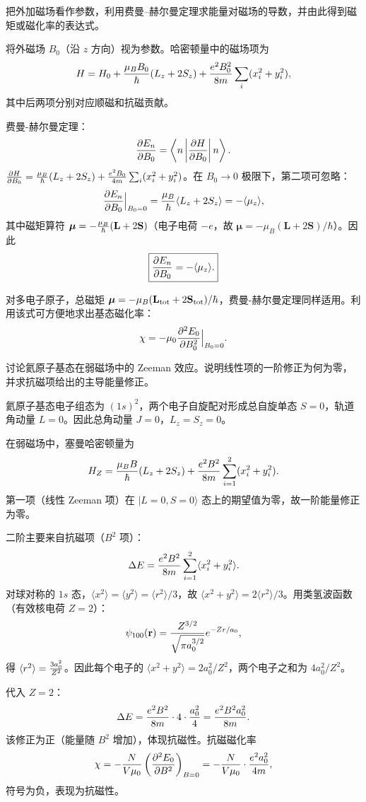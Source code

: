 \begin{question}
把外加磁场看作参数，利用费曼--赫尔曼定理求能量对磁场的导数，并由此得到磁矩或磁化率的表达式。
\end{question}
\begin{solution}
将外磁场 $B_0$（沿 $z$ 方向）视为参数。哈密顿量中的磁场项为
\[
H = H_0 + {\mu_B B_0\over\hbar}(L_z+2S_z) + {e^2B_0^2\over8m}\sum_i(x_i^2+y_i^2),
\]
其中后两项分别对应顺磁和抗磁贡献。

费曼-赫尔曼定理：
\[
{\partial E_n\over\partial B_0}
= \left\langle n\left| {\partial H\over\partial B_0} \right| n \right\rangle.
\]
${\partial H\over\partial B_0} = {\mu_B\over\hbar}(L_z+2S_z) + {e^2B_0\over4m}\sum_i(x_i^2+y_i^2)$。在 $B_0\to0$ 极限下，第二项可忽略：
\[
{\partial E_n\over\partial B_0}\Big|_{B_0=0}
= {\mu_B\over\hbar}\langle L_z+2S_z\rangle
= -\langle \mu_z\rangle,
\]
其中磁矩算符 $\boldsymbol\mu = -{\mu_B\over\hbar}(\mathbf L + 2\mathbf S)$（电子电荷 $-e$，故 $\boldsymbol\mu = -\mu_B(\mathbf L+2\mathbf S)/\hbar$）。因此
\[
\boxed{{\partial E_n\over\partial B_0} = -\langle\mu_z\rangle.}
\]

对多电子原子，总磁矩 $\boldsymbol\mu = -\mu_B(\mathbf L_{\rm tot}+2\mathbf S_{\rm tot})/\hbar$，费曼-赫尔曼定理同样适用。利用该式可方便地求出基态磁化率：
\[
\chi = -\mu_0{\partial^2 E_0\over\partial B_0^2}\Big|_{B_0=0}.
\]
\end{solution}

\begin{question}
讨论氦原子基态在弱磁场中的 Zeeman 效应。说明线性项的一阶修正为何为零，并求抗磁项给出的主导能量修正。
\end{question}
\begin{solution}
氦原子基态电子组态为 $(1s)^2$，两个电子自旋配对形成总自旋单态 $S=0$，轨道角动量 $L=0$。因此总角动量 $J=0$，$L_z=S_z=0$。

在弱磁场中，塞曼哈密顿量为
\[
H_Z = {\mu_B B\over\hbar}(L_z+2S_z) + {e^2B^2\over8m}\sum_{i=1}^2(x_i^2+y_i^2).
\]
第一项（线性 Zeeman 项）在 $|L=0,S=0\rangle$ 态上的期望值为零，故一阶能量修正为零。

二阶主要来自抗磁项（$B^2$ 项）：
\[
\Delta E = {e^2B^2\over8m}\sum_{i=1}^2\langle x_i^2+y_i^2\rangle.
\]
对球对称的 $1s$ 态，$\langle x^2\rangle = \langle y^2\rangle = \langle r^2\rangle/3$，故 $\langle x^2+y^2\rangle = 2\langle r^2\rangle/3$。用类氢波函数（有效核电荷 $Z=2$）：
\[
\psi_{100}(\mathbf r) = {Z^{3/2}\over\sqrt{\pi a_0^{3/2}}}e^{-Zr/a_0},
\]
得 $\langle r^2\rangle = {3a_0^2\over Z^2}$。因此每个电子的 $\langle x^2+y^2\rangle = 2a_0^2/Z^2$，两个电子之和为 $4a_0^2/Z^2$。

代入 $Z=2$：
\[
\Delta E = {e^2B^2\over8m}\cdot 4\cdot {a_0^2\over 4} = {e^2B^2 a_0^2\over8m}.
\]
该修正为正（能量随 $B^2$ 增加），体现抗磁性。抗磁磁化率
\[
\chi = -{N\over V\mu_0}\left({\partial^2 E_0\over\partial B^2}\right)_{B=0}
= -{N\over V\mu_0}\cdot{e^2a_0^2\over4m},
\]
符号为负，表现为抗磁性。
\end{solution}

